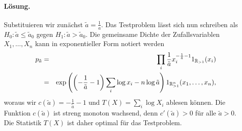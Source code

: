 \paragraph*{Lösung. } Substituieren wir zunächst $\tilde a = \frac{1}{a}$. Das Testproblem lässt sich
nun schreiben als $H_0: \tilde a \leq \tilde a_0$ gegen $H_1: \tilde a > \tilde a_0$. Die gemeinsame
Dichte der Zufallsvariablen $X_1,\ldots,X_n$ kann in exponentieller Form notiert werden
\begin{eqnarray*}
    p_{\tilde a} &=& \prod_i \frac{1}{\tilde a} x_i^{ -\frac{1}{\tilde a} -1 } 1_{\mathbb R_{>1}}(x_i) \\
    &=& \exp \left( \left( -\frac{1}{\tilde a} -1 \right) \sum_{i}^{}\log x_i
    -n \log \tilde a \right) 1_{\mathbb R_{>1}^n}(x_1,\ldots,x_n), \\
\end{eqnarray*}
woraus wir $c(\tilde a)=-\frac{1}{\tilde a} -1$ und $T(X)= \sum_{i}^{} \log X_i$ ablesen können.
Die Funktion $c(\tilde a)$ ist streng monoton wachsend, denn $c'(\tilde a ) >0$ für alle $\tilde a>0$. 
Die Statistik $T(X)$ ist daher optimal für das Testproblem. 




